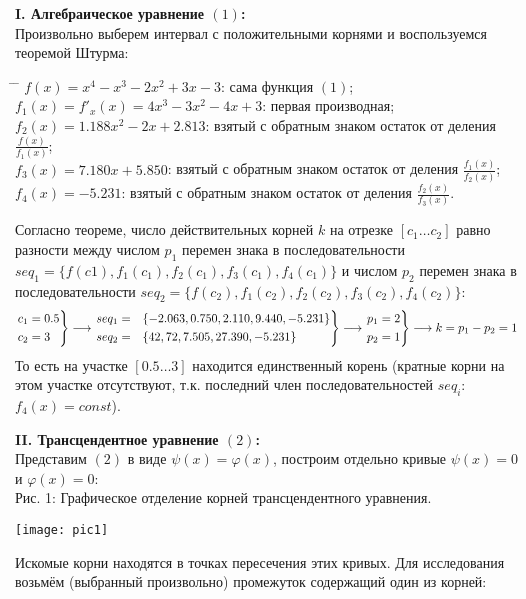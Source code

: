 {\large\bf{I. Алгебраическое уравнение $(1)$:}}\\
Произвольно выберем интервал с положительными корнями и воспользуемся теоремой Штурма:
\begin{tabbing}
    \hspace*{4cm}\= \hspace*{6cm} \= \kill
    \> $f(x) = x^4 - x^3 - 2x^2 + 3x - 3$:\> сама функция $(1)$;\\
    \> $f_1(x) = f'_x(x) = 4x^3 - 3x^2 - 4x + 3$:\> первая производная;\\
    \> $f_2(x) = 1.188x^2-2x+2.813$:\> взятый с обратным знаком остаток от деления $\frac{f(x)}{f_1(x)}$;\\
    \> $f_3(x) = 7.180x+5.850$:\> взятый с обратным знаком остаток от деления $\frac{f_1(x)}{f_2(x)}$;\\
    \> $f_4(x) = -5.231$:\> взятый с обратным знаком остаток от деления $\frac{f_2(x)}{f_3(x)}$.
\end{tabbing}
Согласно теореме, число действительных корней $k$ на отрезке $[c_1 \ldots c_2]$ равно разности между числом $p_1$ перемен знака в последовательности $seq_1=\{f(c1), f_1(c_1), f_2(c_1), f_3(c_1), f_4(c_1)\}$ и числом
$p_2$ перемен знака в последовательности $seq_2=\{f(c_2), f_1(c_2), f_2(c_2), f_3(c_2), f_4(c_2)\}$:
\begin{align}
    \begin{rcases}
        c_1 =0.5 \\
        c_2 =3
    \end{rcases}
    \longrightarrow
    \begin{rcases}
        seq_1=&\{-2.063, 0.750, 2.110, 9.440, -5.231\} \\
        seq_2=&\{42, 72, 7.505, 27.390, -5.231\}
    \end{rcases}
    \longrightarrow
    \begin{rcases}
        p_1=2 \\
        p_2=1
    \end{rcases}
    \longrightarrow
    k=p_1-p_2=1
\end{align}
То есть на участке $[0.5 \ldots 3]$ находится единственный корень (кратные корни на этом участке отсутствуют, т.к. последний член последовательностей $seq_i$:  $f_4(x)=const$).

\newpage

{\large\bf{II. Трансцендентное уравнение $(2)$:}}\\
Представим $(2)$ в виде $\psi(x)=\varphi(x)$, построим отдельно кривые $\psi(x)=0$ и $\varphi(x)=0$:\\
Рис. 1: Графическое отделение корней трансцендентного уравнения.
\begin{center}
    \texttt{[image: pic1]}
\end{center}
Искомые корни находятся в точках пересечения этих кривых. Для исследования возьмём (выбранный произвольно) промежуток содержащий один из корней:
\begin{align}
    [0.6 \ldots 1.5]
\end{align}

